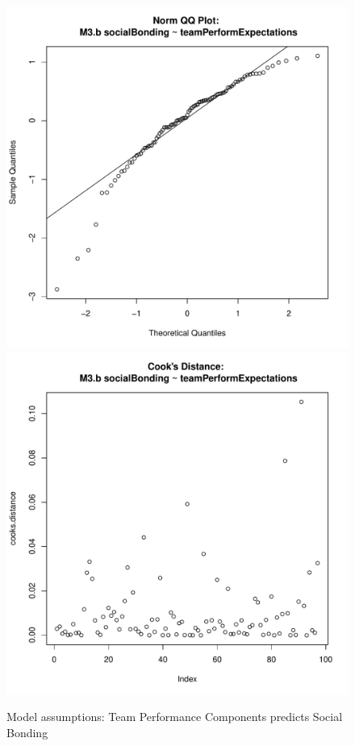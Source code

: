 {\begin{figure}[htbp]
        \includegraphics[scale =.4]{images/MLM3bQQNorm.pdf}
        \includegraphics[scale =.4]{images/MLM3bCooksD.pdf}
        \caption{Model assumptions: Team Performance Components predicts Social Bonding }
        \label{fig:MLM3bAssumptions}
      \end{figure}

}
